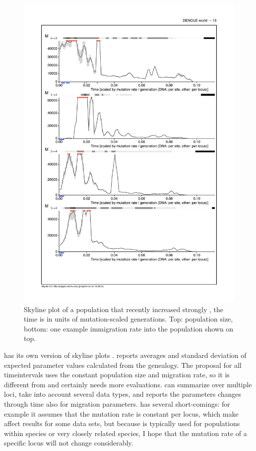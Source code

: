 \begin{figure}[!h]
\begin{center}
\includegraphics[scale=0.9]{mim/skylineM}
\end{center}
\vskip -1cm 
\caption{Skyline plot of a population that recently increased strongly , the time is in units of mutation-scaled generations. Top: population size, bottom: one example immigration rate into the population shown on top.
\label{SKYPLOT}}
\end{figure}

\migrate has its own version of skyline plots \cite{strimmer:2001:edh,Shapiro:2004:RFB,Drummond:2005:bci}. \migrate reports averages and standard deviation of expected parameter values calculated from the genealogy. The proposal for all timeintervals uses the constant population size and migration rate, so it is different from  \cite{Drummond:2005:bci} and certainly needs more evaluations. \migrate can summarize over multiple loci, take into account several data types, and reports the parameters changes through time also for migration parameters. \migrate has several short-comings: for example it assumes that the mutation rate is constant per locus, which make affect results for some data sets, but because \migrate is typically used for populations within species or very closely related species, I hope that the mutation rate of a specific locus will not change considerably.

